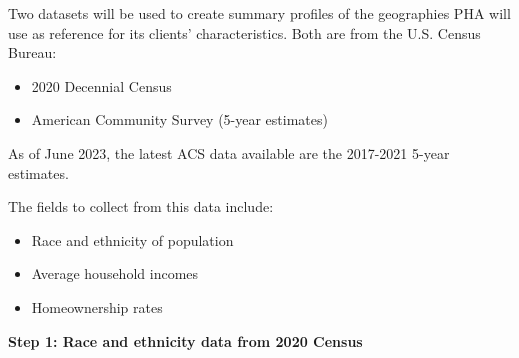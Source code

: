 \documentclass[
  letterpaper,
  DIV=11,
  numbers=noendperiod]{scrartcl}
\providecommand{\tightlist}{%
  \setlength{\itemsep}{0pt}\setlength{\parskip}{0pt}}\usepackage{longtable,booktabs,array}
\begin{document}
Two datasets will be used to create summary profiles of the geographies
PHA will use as reference for its clients' characteristics. Both are
from the U.S. Census Bureau:

\begin{itemize}
\tightlist
\item
  2020 Decennial Census
\item
  American Community Survey (5-year estimates)
\end{itemize}

\begin{tcolorbox}[enhanced jigsaw, coltitle=black, titlerule=0mm, breakable, colbacktitle=quarto-callout-note-color!10!white, opacityback=0, leftrule=.75mm, opacitybacktitle=0.6, rightrule=.15mm, title=\textcolor{quarto-callout-note-color}{\faInfo}\hspace{0.5em}{Note}, arc=.35mm, colback=white, bottomtitle=1mm, toptitle=1mm, colframe=quarto-callout-note-color-frame, bottomrule=.15mm, toprule=.15mm, left=2mm]

As of June 2023, the latest ACS data available are the 2017-2021 5-year
estimates.

\end{tcolorbox}

The fields to collect from this data include:

\begin{itemize}
\tightlist
\item
  Race and ethnicity of population
\item
  Average household incomes
\item
  Homeownership rates
\end{itemize}

\textbf{Step 1: Race and ethnicity data from 2020 Census}
\end{document}
